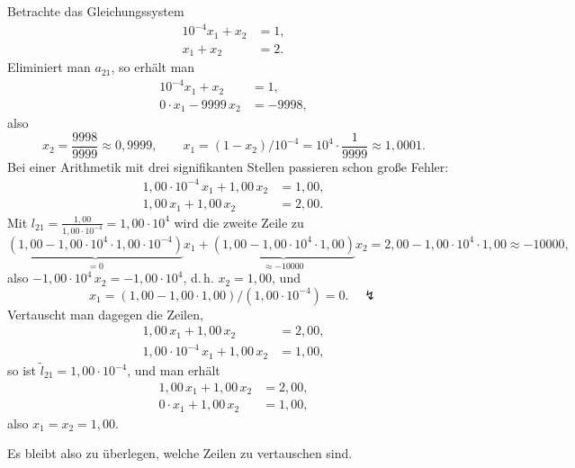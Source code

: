 \documentclass[11pt]{article}
\begin{document}
\begin{example}
  Betrachte das Gleichungssystem
  \begin{align*}
    10^{-4} x_1 + x_2 &= 1, \\
    x_1 + x_2 &= 2.
  \end{align*}
  Eliminiert man $a_{21}$, so erhält man
  \begin{align*}
    10^{-4} x_1 + x_2 &= 1, \\
    0 \cdot x_1 - 9999\, x_2 &= -9998,
  \end{align*}
  also
  \[ x_2 = \frac{9998}{9999} \approx 0{,}9999, \qquad x_1 = (1 - x_2) / 10^{-4} = 10^4 \cdot \frac{1}{9999} \approx 1{,}0001. \]
Bei einer Arithmetik mit drei signifikanten Stellen passieren schon große Fehler:
  \begin{align*}
    1{,}00 \cdot 10^{-4}\, x_1 + 1{,}00\, x_2 &= 1{,}00, \\
    1{,}00\, x_1 + 1{,}00\, x_2 &= 2{,}00.
  \end{align*}
Mit $l_{21} = \frac{1{,}00}{1{,}00 \cdot 10^{-4}} = 1{,}00 \cdot 10^4$ wird die zweite Zeile zu
  \[
    \underbrace{(1{,}00 - 1{,}00 \cdot 10^4 \cdot 1{,}00 \cdot 10^{-4})}_{= 0} x_1 + \underbrace{(1{,}00 - 1{,}00 \cdot 10^4 \cdot 1{,}00)}_{\approx -10000} x_2 = 2{,}00 - 1{,}00 \cdot 10^4 \cdot 1{,}00 \approx -10000,
  \]
  also $-1{,}00 \cdot 10^4\, x_2 = -1{,}00 \cdot 10^4$, d.\,h. $x_2 = 1{,}00$, und
  \[ x_1 = (1{,}00 - 1{,}00 \cdot 1{,}00) / (1{,}00 \cdot 10^{-4}) = 0. \quad \lightning \]
Vertauscht man dagegen die Zeilen,
  \begin{align*}
    1{,}00\, x_1 + 1{,}00\, x_2 &= 2{,}00, \\
    1{,}00 \cdot 10^{-4}\, x_1 + 1{,}00\, x_2 &= 1{,}00,
  \end{align*}
  so ist $\tilde{l}_{21} = 1{,}00 \cdot 10^{-4}$, und man erhält
  \begin{align*}
    1{,}00\, x_1 + 1{,}00\, x_2 &= 2{,}00, \\
    0 \cdot x_1 + 1{,}00\, x_2 &= 1{,}00,
  \end{align*}
  also $x_1 = x_2 = 1{,}00$.
\end{example}


Es bleibt also zu überlegen, welche Zeilen zu vertauschen sind.

\end{document}
